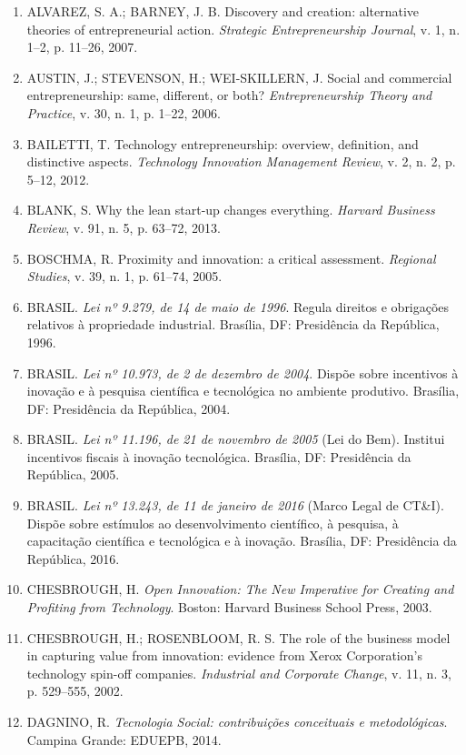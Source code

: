 \begin{enumerate}[leftmargin=1.5em, itemsep=3.5pt]
  \item ALVAREZ, S. A.; BARNEY, J. B. Discovery and creation: alternative theories of entrepreneurial action. \textit{Strategic Entrepreneurship Journal}, v. 1, n. 1--2, p. 11--26, 2007.
  \item AUSTIN, J.; STEVENSON, H.; WEI-SKILLERN, J. Social and commercial entrepreneurship: same, different, or both? \textit{Entrepreneurship Theory and Practice}, v. 30, n. 1, p. 1--22, 2006.
  \item BAILETTI, T. Technology entrepreneurship: overview, definition, and distinctive aspects. \textit{Technology Innovation Management Review}, v. 2, n. 2, p. 5--12, 2012.
  \item BLANK, S. Why the lean start-up changes everything. \textit{Harvard Business Review}, v. 91, n. 5, p. 63--72, 2013.
  \item BOSCHMA, R. Proximity and innovation: a critical assessment. \textit{Regional Studies}, v. 39, n. 1, p. 61--74, 2005.
  \item BRASIL. \textit{Lei nº 9.279, de 14 de maio de 1996}. Regula direitos e obrigações relativos à propriedade industrial. Brasília, DF: Presidência da República, 1996.
  \item BRASIL. \textit{Lei nº 10.973, de 2 de dezembro de 2004}. Dispõe sobre incentivos à inovação e à pesquisa científica e tecnológica no ambiente produtivo. Brasília, DF: Presidência da República, 2004.
  \item BRASIL. \textit{Lei nº 11.196, de 21 de novembro de 2005} (Lei do Bem). Institui incentivos fiscais à inovação tecnológica. Brasília, DF: Presidência da República, 2005.
  \item BRASIL. \textit{Lei nº 13.243, de 11 de janeiro de 2016} (Marco Legal de CT\&I). Dispõe sobre estímulos ao desenvolvimento científico, à pesquisa, à capacitação científica e tecnológica e à inovação. Brasília, DF: Presidência da República, 2016.
  \item CHESBROUGH, H. \textit{Open Innovation: The New Imperative for Creating and Profiting from Technology}. Boston: Harvard Business School Press, 2003.
  \item CHESBROUGH, H.; ROSENBLOOM, R. S. The role of the business model in capturing value from innovation: evidence from Xerox Corporation's technology spin-off companies. \textit{Industrial and Corporate Change}, v. 11, n. 3, p. 529--555, 2002.
  \item DAGNINO, R. \textit{Tecnologia Social: contribuições conceituais e metodológicas}. Campina Grande: EDUEPB, 2014.

\end{enumerate}

